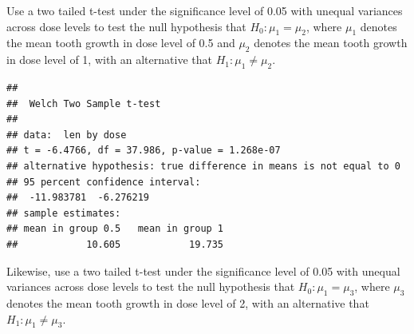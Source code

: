 \documentclass[]{article}
\newenvironment{Shaded}{\begin{snugshade}}{\end{snugshade}}
\newcommand{\KeywordTok}[1]{\textcolor[rgb]{0.13,0.29,0.53}{\textbf{#1}}}
\newcommand{\DataTypeTok}[1]{\textcolor[rgb]{0.13,0.29,0.53}{#1}}
\newcommand{\DecValTok}[1]{\textcolor[rgb]{0.00,0.00,0.81}{#1}}
\newcommand{\StringTok}[1]{\textcolor[rgb]{0.31,0.60,0.02}{#1}}
\newcommand{\OperatorTok}[1]{\textcolor[rgb]{0.81,0.36,0.00}{\textbf{#1}}}
\newcommand{\NormalTok}[1]{#1}
\begin{document}
Use a two tailed t-test under the significance level of 0.05 with
unequal variances across dose levels to test the null hypothesis that
\(H_0: \mu_1=\mu_2\), where \(\mu_1\) denotes the mean tooth growth in
dose level of 0.5 and \(\mu_2\) denotes the mean tooth growth in dose
level of 1, with an alternative that \(H_1: \mu_1\ne\mu_2\).

\begin{Shaded}
\end{Shaded}

\begin{verbatim}
## 
##  Welch Two Sample t-test
## 
## data:  len by dose
## t = -6.4766, df = 37.986, p-value = 1.268e-07
## alternative hypothesis: true difference in means is not equal to 0
## 95 percent confidence interval:
##  -11.983781  -6.276219
## sample estimates:
## mean in group 0.5   mean in group 1 
##            10.605            19.735
\end{verbatim}

Likewise, use a two tailed t-test under the significance level of 0.05
with unequal variances across dose levels to test the null hypothesis
that \(H_0: \mu_1=\mu_3\), where \(\mu_3\) denotes the mean tooth growth
in dose level of 2, with an alternative that \(H_1: \mu_1\ne\mu_3\).

\begin{Shaded}
\end{Shaded}
\end{document}
